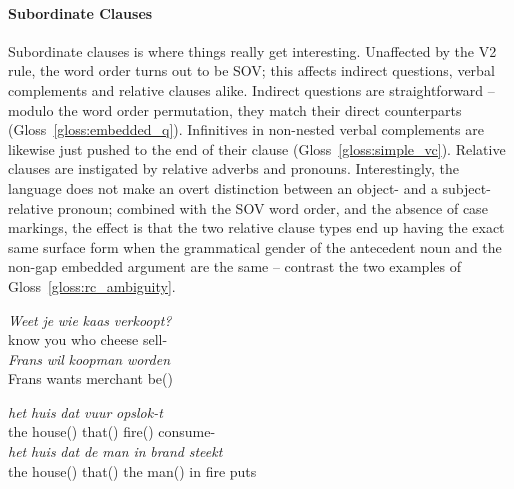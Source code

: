 \paragraph{Subordinate Clauses}
Subordinate clauses is where things really get interesting.
Unaffected by the V2 rule, the word order turns out to be SOV; this affects indirect questions, verbal complements and relative clauses alike.
Indirect questions are straightforward -- modulo the word order permutation, they match their direct counterparts (Gloss~\ref{gloss:embedded_q}).
Infinitives in non-nested verbal complements are likewise just pushed to the end of their clause (Gloss~\ref{gloss:simple_vc}).
Relative clauses are instigated by relative adverbs and pronouns.
Interestingly, the language does not make an overt distinction between an object- and a subject- relative pronoun; combined with the SOV word order, and the absence of case markings, the effect is that the two relative clause types end up having the exact same surface form when the grammatical gender of the antecedent noun and the non-gap embedded argument are the same -- contrast the two examples of Gloss~\ref{gloss:rc_ambiguity}.
\begin{exe}
\ex\label{gloss:embedded_q}
\gll \textit{Weet} \textit{je} \textit{wie} \textit{kaas} \textit{verkoopt?}\\
know you who cheese sell-\\
\ex\label{gloss:simple_vc}
\gll \textit{Frans} \textit{wil} \textit{koopman} \textit{worden}\\
Frans wants merchant be()\\
\ex\label{gloss:rc_ambiguity}
\begin{xlist}
\ex
\gll \textit{het} \textit{huis} \textit{dat} \textit{vuur} \textit{opslok-t}\\
the house() that() fire() consume-\\
\ex
\gll \textit{het} \textit{huis} \textit{dat} \textit{de} \textit{man} \textit{in} \textit{brand} \textit{steekt}\\
the house() that() the man() in fire puts\\
\end{xlist}
\end{exe}

